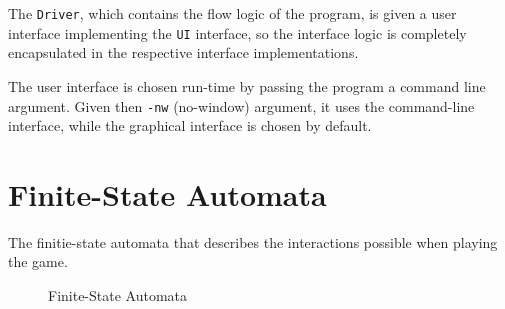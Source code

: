 \documentclass{article}
\begin{document}
The {\tt Driver}, which contains the flow logic of the program, is given a user interface implementing the {\tt UI} interface, so the interface logic is completely encapsulated in the respective interface implementations.

The user interface is chosen run-time by passing the program a command line argument. Given then {\tt -nw} (no-window) argument, it uses the command-line interface, while the graphical interface is chosen by default.

\section{Finite-State Automata}
The finitie-state automata that describes the interactions possible when playing the game.
\label{sec:fsa}
\begin{figure}[H]

\caption{Finite-State Automata}
\end{figure}
\end{document}
